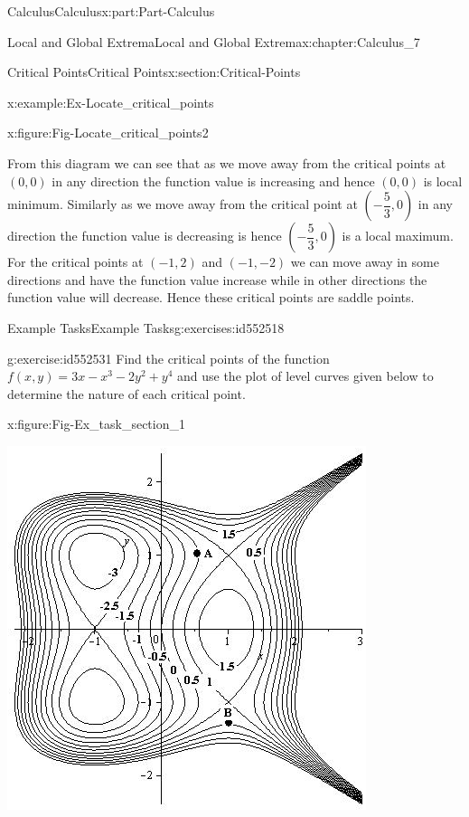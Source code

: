 \documentclass[oneside,10pt,]{book}
\numberwithin{equation}{section}
\begin{document}
\begin{partptx}{Calculus}{}{Calculus}{}{}{x:part:Part-Calculus}
\begin{chapterptx}{Local and Global Extrema}{}{Local and Global Extrema}{}{}{x:chapter:Calculus_7}
\begin{sectionptx}{Critical Points}{}{Critical Points}{}{}{x:section:Critical-Points}
\begin{example}{}{x:example:Ex-Locate_critical_points}
\begin{figureptx}{}{x:figure:Fig-Locate_critical_points2}{}
\begin{image}{0.1}{0.8}{0.1}
\end{image}%
\tcblower
\end{figureptx}%
From this diagram we can see that as we move away from the critical points at \(\left(0,0\right)\) in any direction the function value is increasing and hence \(\left(0,0\right)\) is local minimum. Similarly as we move away from the critical point at \(\left(-\dfrac{5}{3},0\right)\) in any direction the function value is decreasing is hence \(\left(-\dfrac{5}{3},0\right)\) is a local maximum. For the critical points at \(\left(-1,2\right)\) and \(\left(-1,-2\right)\) we can move away in some directions and have the function value increase while in other directions the function value will decrease. Hence these critical points are saddle points.%
\end{example}
%
%
\typeout{************************************************}
\typeout{************************************************}
%
\begin{exercises-subsection-numberless}{Example Tasks}{}{Example Tasks}{}{}{g:exercises:id552518}
\begin{divisionexercise}{1}{}{}{g:exercise:id552531}%
Find the critical points of the function \(f(x,y) = 3x-x^3-2y^2+y^4\) and use the plot of level curves given below to determine the nature of each critical point.%
\begin{figureptx}{}{x:figure:Fig-Ex_task_section_1}{}%
\begin{image}{0.1}{0.8}{0.1}%
\includegraphics[width=\linewidth]{./Calculus/Images/7/Ex_task_section_1.png}

\end{image}
\end{figureptx}
\end{divisionexercise}
\end{exercises-subsection-numberless}
\end{sectionptx}
\end{chapterptx}
\end{partptx}
\end{document}
